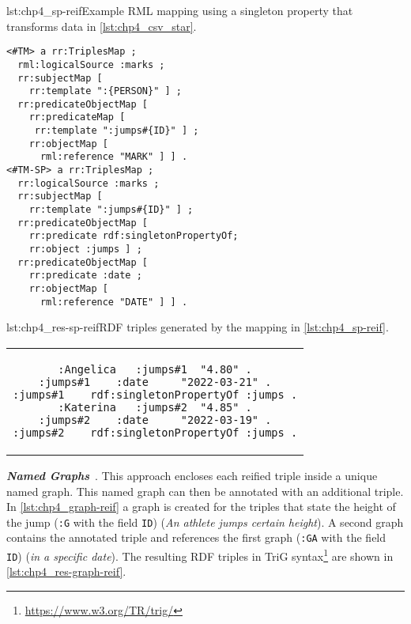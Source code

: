 \begin{minipage}{\linewidth}
\begin{captionedlisting}{lst:chp4_sp-reif}{Example RML mapping using a singleton property that transforms data in \cref{lst:chp4_csv_star}.}
\centering
\begin{multicols}{2}
{\begin{lstlisting}[basicstyle=\ttfamily\small,label={list:example1},columns=flexible]
<#TM> a rr:TriplesMap ;
  rml:logicalSource :marks ;
  rr:subjectMap [ 
    rr:template ":{PERSON}" ] ;
  rr:predicateObjectMap [ 
    rr:predicateMap [
     rr:template ":jumps#{ID}" ] ;
    rr:objectMap [
      rml:reference "MARK" ] ] .
<#TM-SP> a rr:TriplesMap ;
  rr:logicalSource :marks ;
  rr:subjectMap [ 
    rr:template ":jumps#{ID}" ] ;
  rr:predicateObjectMap [ 
    rr:predicate rdf:singletonPropertyOf;
    rr:object :jumps ] ;
  rr:predicateObjectMap [ 
    rr:predicate :date ;
    rr:objectMap [
      rml:reference "DATE" ] ] .
\end{lstlisting}}
\end{multicols}
\end{captionedlisting}
\end{minipage}



\noindent\hspace{0.12\linewidth}\begin{minipage}{\linewidth}
\begin{captionedlisting}{lst:chp4_res-sp-reif}{RDF triples generated by the mapping in \cref{lst:chp4_sp-reif}.}
\centering
\begin{tabular}{c}
\hspace{4em}
{\begin{lstlisting}[basicstyle=\ttfamily\small,label={list:example1},columns=flexible]
:Angelica   :jumps#1  "4.80" .
:jumps#1    :date     "2022-03-21" .
:jumps#1    rdf:singletonPropertyOf :jumps .
:Katerina   :jumps#2  "4.85" .
:jumps#2    :date     "2022-03-19" .
:jumps#2    rdf:singletonPropertyOf :jumps .
\end{lstlisting}}
\end{tabular}
\end{captionedlisting}
\end{minipage}



\textit{\textbf{Named Graphs}}~\citep{carroll2005namedgraphs}. This approach encloses each reified triple inside a unique named graph. This named graph can then be annotated with an additional triple. In \cref{lst:chp4_graph-reif} a graph is created for the triples that state the height of the jump (\texttt{:G} with the field \texttt{ID}) (\textit{An athlete jumps certain height}). A second graph contains the annotated triple and references the first graph (\texttt{:GA} with the field \texttt{ID}) (\textit{in a specific date}). The resulting RDF triples in TriG syntax\footnote{\url{https://www.w3.org/TR/trig/}} are shown in \cref{lst:chp4_res-graph-reif}.

